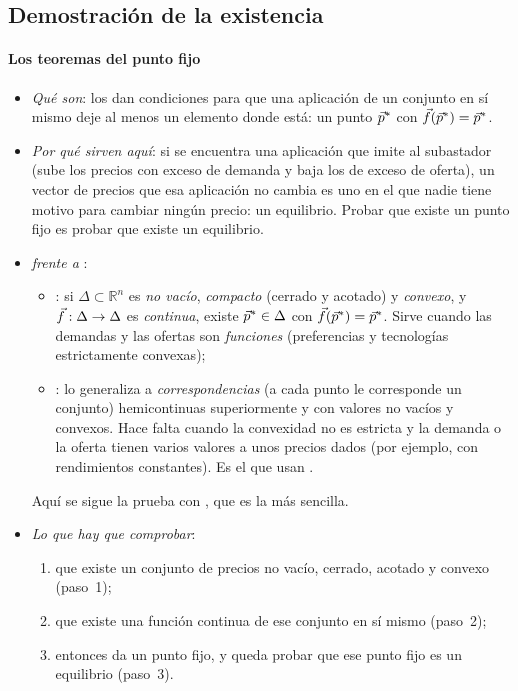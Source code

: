 \documentclass[11pt]{article}
\begin{document}
\subsection{Demostración de la existencia}\label{anexo:demostracion-existencia}

\paragraph{Los teoremas del punto fijo}

\begin{itemize}
\item \emph{Qué son}: los  dan condiciones para que una aplicación de un conjunto en sí mismo deje al menos un elemento donde está: un punto $\vec{p}^*$ con $\vec{f}(\vec{p}^*)=\vec{p}^*$.
\item \emph{Por qué sirven aquí}: si se encuentra una aplicación que imite al subastador (sube los precios con exceso de demanda y baja los de exceso de oferta), un vector de precios que esa aplicación no cambia es uno en el que nadie tiene motivo para cambiar ningún precio: un equilibrio. Probar que existe un punto fijo es probar que existe un equilibrio.
\item \emph{ frente a }:
  \begin{itemize}
  \item {}\nocite{Brouwer1911Abbildung}: si $\Delta\subset\mathbb{R}^n$ es \emph{no vacío}, \emph{compacto} (cerrado y acotado) y \emph{convexo}, y $\vec{f}:\Delta\to\Delta$ es \emph{continua}, existe $\vec{p}^*\in\Delta$ con $\vec{f}(\vec{p}^*)=\vec{p}^*$. Sirve cuando las demandas y las ofertas son \emph{funciones} (preferencias y tecnologías estrictamente convexas);
  \item {}\nocite{Kakutani1941Generalization}: lo generaliza a \emph{correspondencias} (a cada punto le corresponde un conjunto) hemicontinuas superiormente y con valores no vacíos y convexos. Hace falta cuando la convexidad no es estricta y la demanda o la oferta tienen varios valores a unos precios dados (por ejemplo, con rendimientos constantes). Es el que usan \textcite{ArrowDebreu1954Existence}.
  \end{itemize}
  Aquí se sigue la prueba con , que es la más sencilla\nocite{MasColellWhinstonGreen1995}.
\item \emph{Lo que hay que comprobar}:
  \begin{enumerate}
  \item que existe un conjunto de precios no vacío, cerrado, acotado y convexo (paso~1);
  \item que existe una función continua de ese conjunto en sí mismo (paso~2);
  \item entonces  da un punto fijo, y queda probar que ese punto fijo es un equilibrio (paso~3).
  \end{enumerate}
\end{itemize}
\end{document}

